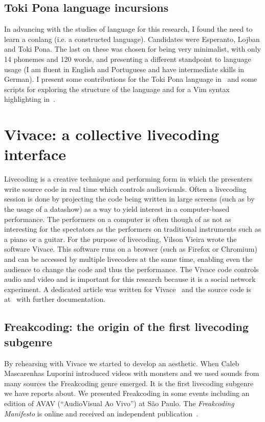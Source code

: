 \begin{apendicesenv}
\subsection{Toki Pona language incursions}
In advancing with the studies of language for this research,
I found the need to learn a conlang (i.e. a constructed language).
Candidates were Esperanto, Lojban and Toki Pona.
The last on these was chosen for being very minimalist,
with only 14 phonemes and 120 words,
and presenting a different standpoint to language usage
(I am fluent in English and Portuguese and have intermediate skills in German).
I present some contributions for the Toki Pona language in~\cite{tokiio}
and some scripts for exploring the structure of the language and for
a Vim syntax highlighting in~\cite{tokir}.

\section{Vivace: a collective livecoding interface}
Livecoding is a creative technique and performing form in which the
presenters write source code in real time which controls audiovisuals.
Often a livecoding session is done by projecting the code being written in
large screens (such as by the usage of a datashow) as a way to yield
interest in a computer-based performance.
The performers on a computer is often though of as not as interesting
for the spectators as the performers on traditional instruments such as a piano or a guitar.
For the purpose of livecoding, Vilson Vieira wrote the software Vivace.
This software runs on a browser (such as Firefox or Chromium)
and can be accessed by multiple livecoders at the same time,
enabling even the audience to change the code and thus the performance.
The Vivace code controls audio and video and is important for
this research because it is a social network experiment.
A dedicated article was written for Vivace~\cite{vivacecmj}
and the source code is at~\cite{vivacecode} with further documentation.

\subsection{Freakcoding: the origin of the first livecoding subgenre}
By rehearsing with Vivace we started to develop an aesthetic.
When Caleb Mascarenhas Luporini introduced videos with monsters and
we used sounds from many sources the Freakcoding genre emerged.
It is the first livecoding subgenre we have reports about.
We presented Freakcoding in some events including an edition
of AVAV (``AudioVisual Ao Vivo'') at São Paulo.
The \emph{Freakcoding Manifesto} is online and received
an independent publication~\cite{freakManifesto}.


\end{apendicesenv}
